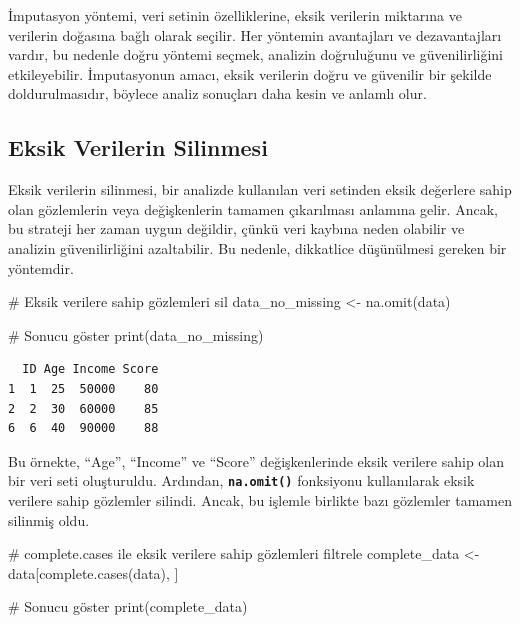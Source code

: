 \documentclass[
  letterpaper,
  DIV=11,
  numbers=noendperiod]{scrreprt}
\newenvironment{Shaded}{\begin{snugshade}}{\end{snugshade}}
\newcommand{\CommentTok}[1]{\textcolor[rgb]{0.37,0.37,0.37}{#1}}
\newcommand{\FunctionTok}[1]{\textcolor[rgb]{0.28,0.35,0.67}{#1}}
\newcommand{\NormalTok}[1]{\textcolor[rgb]{0.00,0.23,0.31}{#1}}
\newcommand{\OtherTok}[1]{\textcolor[rgb]{0.00,0.23,0.31}{#1}}
\begin{document}
İmputasyon yöntemi, veri setinin özelliklerine, eksik verilerin
miktarına ve verilerin doğasına bağlı olarak seçilir. Her yöntemin
avantajları ve dezavantajları vardır, bu nedenle doğru yöntemi seçmek,
analizin doğruluğunu ve güvenilirliğini etkileyebilir. İmputasyonun
amacı, eksik verilerin doğru ve güvenilir bir şekilde doldurulmasıdır,
böylece analiz sonuçları daha kesin ve anlamlı olur.

\subsection*{Eksik Verilerin Silinmesi}\label{eksik-verilerin-silinmesi}

Eksik verilerin silinmesi, bir analizde kullanılan veri setinden eksik
değerlere sahip olan gözlemlerin veya değişkenlerin tamamen çıkarılması
anlamına gelir. Ancak, bu strateji her zaman uygun değildir, çünkü veri
kaybına neden olabilir ve analizin güvenilirliğini azaltabilir. Bu
nedenle, dikkatlice düşünülmesi gereken bir yöntemdir.

\begin{Shaded}
\begin{Highlighting}[]
\CommentTok{\# Eksik verilere sahip gözlemleri sil}
\NormalTok{data\_no\_missing }\OtherTok{\textless{}{-}} \FunctionTok{na.omit}\NormalTok{(data)}

\CommentTok{\# Sonucu göster}
\FunctionTok{print}\NormalTok{(data\_no\_missing)}
\end{Highlighting}
\end{Shaded}

\begin{verbatim}
  ID Age Income Score
1  1  25  50000    80
2  2  30  60000    85
6  6  40  90000    88
\end{verbatim}

Bu örnekte, ``Age'', ``Income'' ve ``Score'' değişkenlerinde eksik
verilere sahip olan bir veri seti oluşturuldu. Ardından,
\textbf{\texttt{na.omit()}} fonksiyonu kullanılarak eksik verilere sahip
gözlemler silindi. Ancak, bu işlemle birlikte bazı gözlemler tamamen
silinmiş oldu.

\begin{Shaded}
\begin{Highlighting}[]
\CommentTok{\# complete.cases ile eksik verilere sahip gözlemleri filtrele}
\NormalTok{complete\_data }\OtherTok{\textless{}{-}}\NormalTok{ data[}\FunctionTok{complete.cases}\NormalTok{(data), ]}

\CommentTok{\# Sonucu göster}
\FunctionTok{print}\NormalTok{(complete\_data)}
\end{Highlighting}
\end{Shaded}
\end{document}
